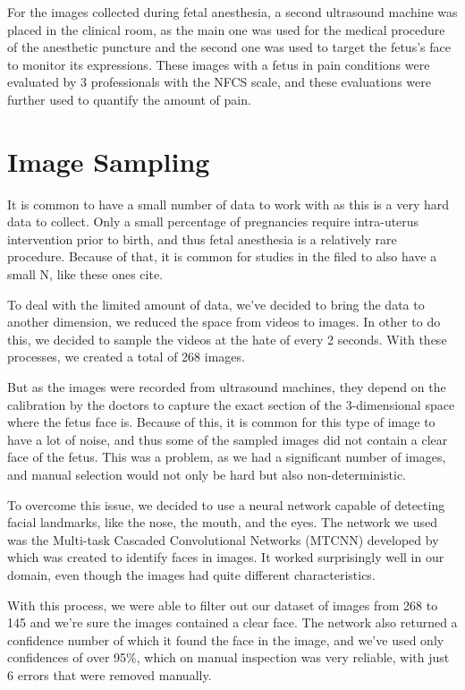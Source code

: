 
For the images collected during fetal anesthesia, a second ultrasound machine was placed in the clinical room, as the main one was used for the medical procedure of the anesthetic puncture and the second one was used to target the fetus's face to monitor its expressions. These images with a fetus in pain conditions were evaluated by 3 professionals with the NFCS scale, and these evaluations were further used to quantify the amount of pain.

\section{Image Sampling}

It is common to have a small number of data to work with as this is a very hard data to collect. Only a small percentage of pregnancies require intra-uterus intervention prior to birth, and thus fetal anesthesia is a relatively rare procedure. Because of that, it is common for studies in the filed to also have a small N, like these ones cite{}.

To deal with the limited amount of data, we've decided to bring the data to another dimension, we reduced the space from videos to images. In other to do this, we decided to sample the videos at the hate of every 2 seconds. With these processes, we created a total of 268 images.

But as the images were recorded from ultrasound machines, they depend on the calibration by the doctors to capture the exact section of the 3-dimensional space where the fetus face is. Because of this, it is common for this type of image to have a lot of noise, and thus some of the sampled images did not contain a clear face of the fetus. This was a problem, as we had a significant number of images, and manual selection would not only be hard but also non-deterministic.

To overcome this issue, we decided to use a neural network capable of detecting facial landmarks, like the nose, the mouth, and the eyes. The network we used was the Multi-task Cascaded Convolutional Networks (MTCNN) developed by \cite{ZhangZL016} which was created to identify faces in images. It worked surprisingly well in our domain, even though the images had quite different characteristics.

With this process, we were able to filter out our dataset of images from 268 to 145 and we're sure the images contained a clear face. The network also returned a confidence number of which it found the face in the image, and we've used only confidences of over 95\%, which on manual inspection was very reliable, with just 6 errors that were removed manually.

